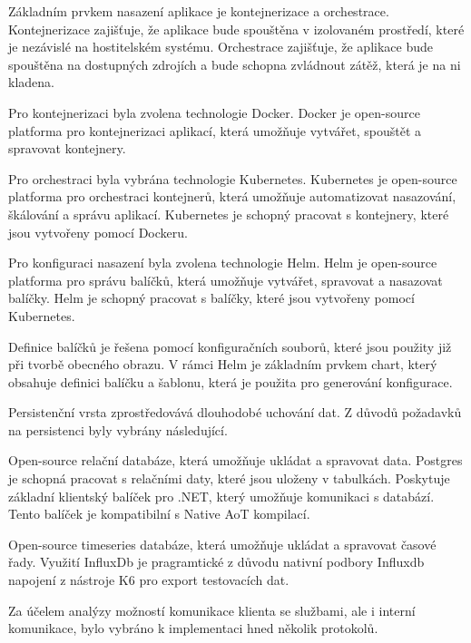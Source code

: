 
Základním prvkem nasazení aplikace je kontejnerizace a orchestrace. Kontejnerizace zajišťuje, že aplikace bude spouštěna v izolovaném prostředí, které je nezávislé na hostitelském systému. Orchestrace zajišťuje, že aplikace bude spouštěna na dostupných zdrojích a bude schopna zvládnout zátěž, která je na ni kladena.

Pro kontejnerizaci byla zvolena technologie Docker. Docker je open-source platforma pro kontejnerizaci aplikací, která umožňuje vytvářet, spouštět a spravovat kontejnery.

Pro orchestraci byla vybrána technologie Kubernetes. Kubernetes je open-source platforma pro orchestraci kontejnerů, která umožňuje automatizovat nasazování, škálování a správu aplikací. Kubernetes je schopný pracovat s kontejnery, které jsou vytvořeny pomocí Dockeru.


Pro konfiguraci nasazení byla zvolena technologie Helm. Helm je open-source platforma pro správu balíčků, která umožňuje vytvářet, spravovat a nasazovat balíčky. Helm je schopný pracovat s balíčky, které jsou vytvořeny pomocí Kubernetes.

Definice balíčků je řešena pomocí konfiguračních souborů, které jsou použity již při tvorbě obecného obrazu. V rámci Helm je základním prvkem chart, který obsahuje definici balíčku a šablonu, která je použita pro generování konfigurace.


Persistenční vrsta zprostředovává dlouhodobé uchování dat. Z důvodů požadavků na persistenci byly vybrány následující.


Open-source relační databáze, která umožňuje ukládat a spravovat data. Postgres je schopná pracovat s relačními daty, které jsou uloženy v tabulkách. Poskytuje základní klientský balíček pro .NET, který umožňuje komunikaci s databází. Tento balíček je kompatibilní s Native AoT kompilací.


Open-source timeseries databáze, která umožňuje ukládat a spravovat časové řady. Využití InfluxDb je pragramtické z důvodu nativní podbory Influxdb napojení z nástroje K6 pro export testovacích dat.


Za účelem analýzy možností komunikace klienta se službami, ale i interní komunikace, bylo vybráno k implementaci hned několik protokolů. 

